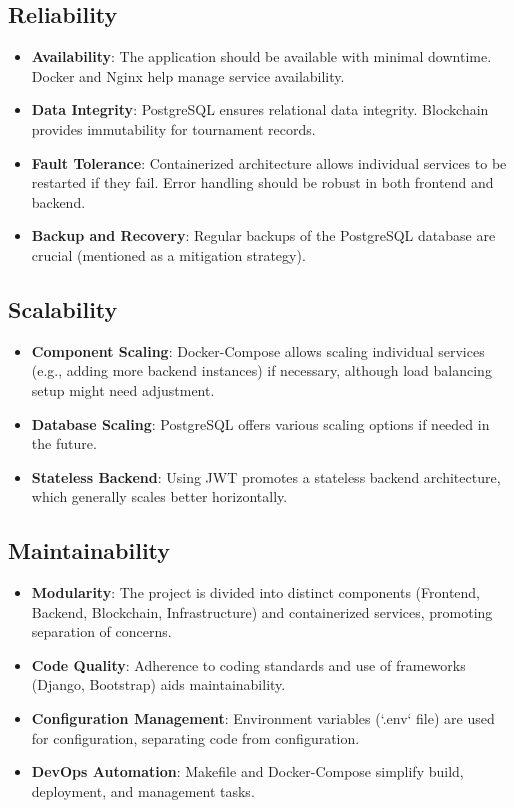 \subsection*{Reliability}
\begin{itemize}
    \item \textbf{Availability}: The application should be available with minimal downtime. Docker and Nginx help manage service availability.
    \item \textbf{Data Integrity}: PostgreSQL ensures relational data integrity. Blockchain provides immutability for tournament records.
    \item \textbf{Fault Tolerance}: Containerized architecture allows individual services to be restarted if they fail. Error handling should be robust in both frontend and backend.
    \item \textbf{Backup and Recovery}: Regular backups of the PostgreSQL database are crucial (mentioned as a mitigation strategy).
\end{itemize}

\subsection*{Scalability}
\begin{itemize}
    \item \textbf{Component Scaling}: Docker-Compose allows scaling individual services (e.g., adding more backend instances) if necessary, although load balancing setup might need adjustment.
    \item \textbf{Database Scaling}: PostgreSQL offers various scaling options if needed in the future.
    \item \textbf{Stateless Backend}: Using JWT promotes a stateless backend architecture, which generally scales better horizontally.
\end{itemize}

\subsection*{Maintainability}
\begin{itemize}
    \item \textbf{Modularity}: The project is divided into distinct components (Frontend, Backend, Blockchain, Infrastructure) and containerized services, promoting separation of concerns.
    \item \textbf{Code Quality}: Adherence to coding standards and use of frameworks (Django, Bootstrap) aids maintainability.
    \item \textbf{Configuration Management}: Environment variables (`.env` file) are used for configuration, separating code from configuration.
    \item \textbf{DevOps Automation}: Makefile and Docker-Compose simplify build, deployment, and management tasks.
\end{itemize}

